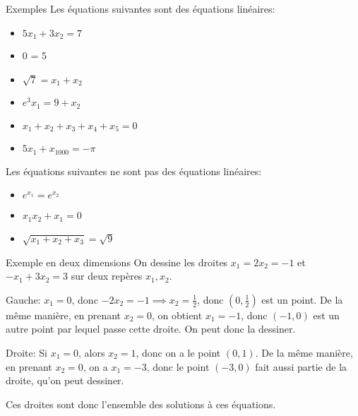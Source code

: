 \documentclass{article}
\begin{document}
\begin{parag}{Exemples}
   Les équations suivantes sont des équations linéaires:
   \begin{itemize}
       \item $5x_1 + 3x_2 = 7$
       \item 0 = 5
       \item $\sqrt{7} = x_1 + x_2$
       \item $e^3 x_1 = 9 + x_2$
       \item $x_1 + x_2 + x_3 + x_4 + x_5 = 0$
       \item $5x_1 + x_{1000} = -\pi$
   \end{itemize}

   Les équations suivantes ne sont pas des équations linéaires:
   \begin{itemize}
       \item $e^{x_1} = e^{x_2}$
       \item $x_1 x_2 + x_1 = 0$
       \item $\sqrt{x_1 + x_2 + x_3} = \sqrt{9}$
   \end{itemize}

\end{parag}

\begin{parag}{Exemple en deux dimensions}
    On dessine les droites $x_1 = 2x_2 = -1$ et $-x_1 + 3x_2 = 3$ sur deux repères $x_1, x_2$.


    Gauche: $x_1 = 0$, donc $-2x_2 = -1 \implies x_2 = \frac{1}{2}$, donc $\left(0, \frac{1}{2}\right)$ est un point. De la même manière, en prenant $x_2 = 0$, on obtient $x_1 = -1$, donc $\left(-1, 0\right)$ est un autre point par lequel passe cette droite. On peut donc la dessiner.

    Droite: Si $x_1 = 0$, alors $x_2 = 1$, donc on a le point $\left(0, 1\right)$. De la même manière, en prenant $x_2 = 0$, on a $x_1 = -3$, donc le point $\left(-3, 0\right)$ fait aussi partie de la droite, qu'on peut dessiner.

    Ces droites sont donc l'ensemble des solutions à ces équations.
\end{parag}
\end{document}
